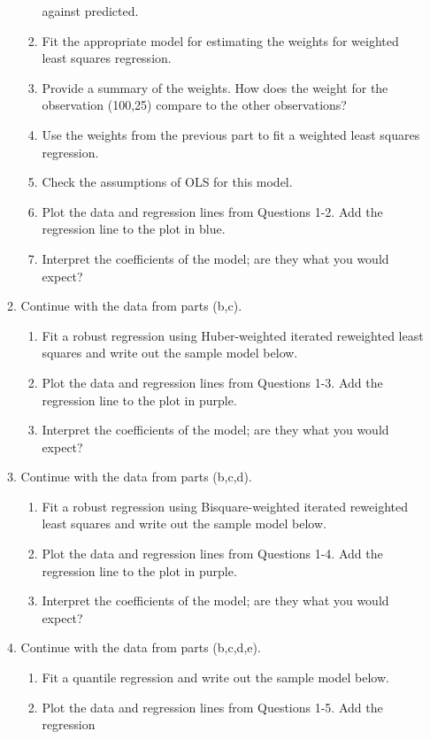 \documentclass{article}
\begin{document}
\begin{enumerate}
\begin{enumerate}
\begin{enumerate}
    against predicted.
    \item Fit the appropriate model for estimating the weights for weighted least 
    squares regression.
    \item Provide a summary of the weights. How does the weight for the observation 
    (100,25) compare to the other observations?
    \item Use the weights from the previous part to fit a weighted least squares 
    regression.
    \item Check the assumptions of OLS for this model.
    \item Plot the data and regression lines from Questions 1-2. Add the regression 
    line to the plot in blue.
    \item Interpret the coefficients of the model; are they what you would expect?
  \end{enumerate}
  \item Continue with the data from parts (b,c).
  \begin{enumerate} 
    \item Fit a robust regression using Huber-weighted iterated reweighted least 
    squares and write out the sample model below.
    \item Plot the data and regression lines from Questions 1-3. Add the regression
    line to the plot in purple.
    \item Interpret the coefficients of the model; are they what you would expect?
  \end{enumerate}
  \item Continue with the data from parts (b,c,d).
  \begin{enumerate}
    \item Fit a robust regression using Bisquare-weighted iterated reweighted 
    least squares and write out the sample model below.
    \item Plot the data and regression lines from Questions 1-4. Add the regression 
    line to the plot in purple.
    \item Interpret the coefficients of the model; are they what you would expect?
  \end{enumerate}
  \item Continue with the data from parts (b,c,d,e).
\begin{enumerate}
    \item Fit a quantile regression and write out the sample model below.
    \item Plot the data and regression lines from Questions 1-5. Add the regression 

\end{enumerate}
\end{enumerate}
\end{enumerate}
\end{document}
